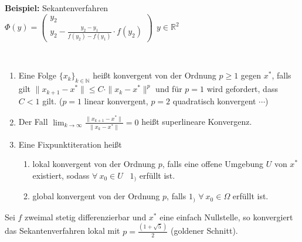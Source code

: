 \textbf{Beispiel:} Sekantenverfahren
\\\hspace*{8mm}$\Phi(y)=\begin{pmatrix} y_2 \\ y_2-\frac{y_2-y_1}{f(y_2)-f(y_1)}\cdot f(y_2)\end{pmatrix} \ \ y\in \mathbb{R}^2$\\
\newline

\begin{definition}[Konvergenzordnung]
~
\begin{enumerate}
\item Eine Folge $\{x_k \}_{k\in\mathbb{N}}$ heißt konvergent von der Ordnung $p\geq 1$ gegen $x^*$,
falls gilt $\| x_{k+1}-x^*\|\leq C\cdot \|x_k-x^*\|^p$ und für $p=1$ wird gefordert, dass $C<1$ gilt.
($p=1$ linear konvergent, $p=2$ quadratisch konvergent $\cdots$)
\item Der Fall $\lim_{k \to \infty}\frac{\|x_{k+1}-x^*\|}{\|x_k -x^*\|}=0$ heißt superlineare Konvergenz.
\item Eine Fixpunktiteration heißt
  \begin{enumerate}
  \item lokal konvergent von der Ordnung $p$, falls eine offene Umgebung $U$ von $x^*$ existiert,
        sodass $\forall \ x_0\in U$ \ $1_)$ erfüllt ist.
  \item global konvergent von der Ordnung $p$, falls $1_)$ $\forall \ x_0\in \Omega$ erfüllt ist.
  \end{enumerate}
\end{enumerate}
\end{definition}

\begin{lemma}
Sei $f$ zweimal stetig differenzierbar und $x^*$ eine einfach Nullstelle, so
konvergiert das Sekantenverfahren lokal mit $p=\frac{(1+\sqrt{5})}{2}$
(goldener Schnitt).
\end{lemma}

